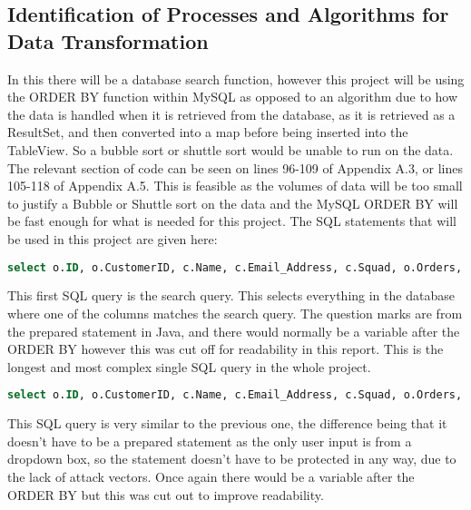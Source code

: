 \documentclass[
11pt, %
a4paper, %
oneside, %
headinclude,footinclude, %
BCOR5mm, %
]{scrartcl}
\begin{document}
\subsection{Identification of Processes and Algorithms for Data Transformation}
In this there will be a database search function, however this project will be using the ORDER BY function within MySQL as opposed to an algorithm due to how the data is handled when it is retrieved from the database, as it is retrieved as a ResultSet, and then converted into a map before being inserted into the TableView. So a bubble sort or shuttle sort would be unable to run on the data. The relevant section of code can be seen on lines 96-109 of Appendix A.3, or lines 105-118 of Appendix A.5. This is feasible as the volumes of data will be too small to justify a Bubble or Shuttle sort on the data and the MySQL ORDER BY will be fast enough for what is needed for this project. The SQL statements that will be used in this project are given here: 
\begin{lstlisting}[language=SQL]
	select o.ID, o.CustomerID, c.Name, c.Email_Address, c.Squad, o.Orders, o.OrderSize, o.OrderNumber, o.NameOnGarment, o.PaidFor, o.PaymentMethod, i.Item from Orders o INNER JOIN Customers c ON o.CustomerID = c.ID INNER JOIN Items i ON i.idItems=o.Order where o.ID like ? or o.CustomerID like ? or c.Name like ? or c.Email_Address like ? or c.Squad like ? or o.Orders like ? or o.OrderSize like ? or o.OrderNumber like ? or  o.NameOnGarment like ? or o.PaymentMethod like ? or i.Item  like ? ORDER BY;	
\end{lstlisting}
This first SQL query is the search query. This selects everything in the database where one of the columns matches the search query. The question marks are from the prepared statement in Java, and there would normally be a variable after the ORDER BY however this was cut off for readability in this report. This is the longest and most complex single SQL query in the whole project.
\begin{lstlisting}[language=SQL]
	select o.ID, o.CustomerID, c.Name, c.Email_Address, c.Squad, o.Orders, o.OrderSize, o.OrderNumber, o.NameOnGarment, o.PaidFor, o.PaymentMethod, i.Item from Orders o INNER JOIN Customers c ON o.CustomerID = c.ID INNER JOIN Items i ON i.idItems=o.Orders ORDER BY;
\end{lstlisting}
This SQL query is very similar to the previous one, the difference being that it doesn't have to be a prepared statement as the only user input is from a dropdown box, so the statement doesn't have to be protected in any way, due to the lack of attack vectors. Once again there would be a variable after the ORDER BY but this was cut out to improve readability.
\end{document}
